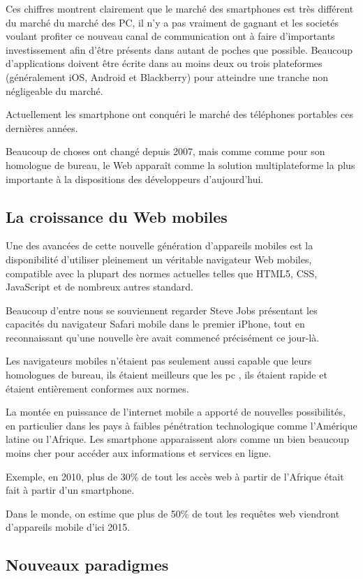 Ces chiffres montrent clairement que le marché des smartphones est très différent du marché du marché des PC, il n’y a pas vraiment de gagnant et les societés voulant profiter ce nouveau canal de communication ont à faire d’importants investissement afin d’être présents dans autant de poches que possible. Beaucoup d’applications doivent être écrite dans au moins deux ou trois plateformes (généralement iOS, Android et Blackberry) pour atteindre une tranche non négligeable du marché.

Actuellement les smartphone ont conquéri le marché des téléphones portables ces dernières années.

Beaucoup de choses ont changé depuis 2007, mais comme comme pour son homologue de bureau, le Web apparaît comme la solution multiplateforme la plus importante à la dispositions des développeurs d’aujourd’hui.

\subsection{La croissance du Web mobiles}

Une des avancées de cette nouvelle génération d’appareils mobiles est la disponibilité d’utiliser pleinement un véritable navigateur Web mobiles, compatible avec la plupart des normes actuelles telles que HTML5, CSS, JavaScript et de nombreux autres standard.

Beaucoup d’entre nous se souviennent regarder Steve Jobs présentant les capacités du navigateur Safari mobile dans le premier iPhone, tout en reconnaissant qu’une nouvelle ère avait commencé précisément ce jour-là.

Les navigateurs mobiles n'étaient pas seulement aussi capable que leurs homologues de bureau, ils étaient meilleurs que les pc , ils étaient rapide et étaient entièrement conformes aux normes.

La montée en puissance de l’internet mobile a apporté de nouvelles possibilités, en particulier dans les pays à faibles pénétration technologique comme l’Amérique latine ou l’Afrique. Les smartphone apparaissent alors comme un bien beaucoup moins cher pour accéder aux informations et services en ligne.

Exemple, en 2010, plus de 30\% de tout les accès web à partir de l’Afrique était fait à partir d’un smartphone.

Dans le monde, on estime que plus de 50\% de tout les requêtes web viendront d’appareils mobile d’ici 2015.

\subsection{Nouveaux paradigmes}


